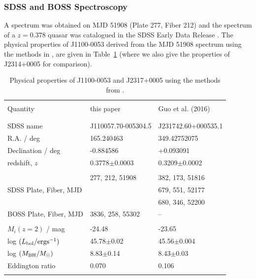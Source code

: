 \documentclass[11pt,a4paper]{article}
\begin{document}
\subsubsection{SDSS and BOSS Spectroscopy}
A spectrum was obtained on MJD 51908 (Plate 277, Fiber 212) and the
spectrum of a $z=0.378$ quasar was catalogued in the SDSS Early Data
Release \citep{Stoughton2002, Schneider2002}. The physical properties
of J1100-0053 derived from the MJD 51908 spectrum using the
methods in \citet{Shen2011}, are given in Table~\ref{tab:Shen_props}
(where we also give the properties of J2314+0005 for comparison). 

\begin{table}[]
    \centering
    \begin{tabular}{l l l }
      \hline \hline 
      &&\\
      Quantity                                          &     this paper                       &  Guo et al. (2016) \\
      &&\\
      \hline 
      &&\\
      SDSS name                                       &    J110057.70-005304.5    &  J231742.60+000535.1 \\
      R.A. / deg                                        &  165.240463                       &  349.42752075  \\
      Declination / deg                            &   -0.884586                        &   +0.093091 \\ 
      redshift, $z$                                    &   0.3778$\pm$0.0003        & 0.3209$\pm$0.0002 \\
      &&\\

\multirow{3}{*}{SDSS Plate, Fiber, MJD }  &  	277, 212,   51908	    &  382, 173, 51816 \\
                                                               &                                           & 679, 551, 52177 \\
                                                               &                                           & 680, 346, 52200 \\
      BOSS Plate, Fiber, MJD                 & 	3836, 258, 55302          	    &    --\\
      &&\\
      $M_{i}(z=2)$  / mag                          &   -24.48                             & -23.65 \\
      log $(L_{\rm bol} / {\rm erg s}^{-1}) $  &  45.78$\pm$0.02               & 45.56$\pm$0.004 \\
      log $(M_{\rm BH} / M_{\odot})  $           &  8.83$\pm$0.14                & 8.43$\pm$0.03\\     
      Eddington ratio                                &        0.070                         & 0.106 \\
      &&\\
      \hline \hline 
    \end{tabular}
    \caption{Physical properties of J1100-0053 and J2317+0005 using the methods from 
      \citet{Shen2011}.} 
    \label{tab:Shen_props}
\end{table}
\end{document}
